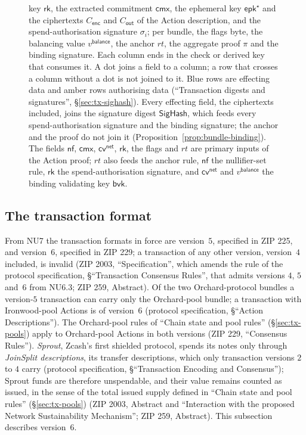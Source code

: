 \documentclass[11pt,a4paper]{article}
\theoremstyle{definition}
\newcommand{\nfsym}{\mathsf{nf}}
\newcommand{\cmx}{\mathsf{cmx}}
\newcommand{\cvsym}{\mathsf{cv}}
\newcommand{\rk}{\mathsf{rk}}
\begin{document}
\begin{figure}[tp]
{key $\rk$, the extracted commitment $\cmx$, the ephemeral key
$\mathsf{epk}^{\star}$ and the ciphertexts $C_{\mathsf{enc}}$ and
$C_{\mathsf{out}}$ of the Action description, and the spend-authorisation
signature $\sigma_i$; per bundle, the flags byte, the balancing value
$v^{\mathsf{balance}}$, the anchor $\mathit{rt}$, the aggregate proof $\pi$
and the binding signature. Each column ends in the check or derived key
that consumes it. A dot joins a field to a column; a row that crosses a
column without a dot is not joined to it. Blue rows are effecting data and
amber rows authorising data (``Transaction digests and signatures'',
\S\ref{sec:tx-sighash}). Every effecting field, the ciphertexts included,
joins the signature digest $\mathsf{SigHash}$, which feeds every
spend-authorisation signature and the binding signature; the anchor and the
proof do not join it (Proposition~\ref{prop:bundle-binding}). The fields
$\nfsym$, $\cmx$, $\cvsym^{\mathsf{net}}$, $\rk$, the flags and
$\mathit{rt}$ are primary inputs of the Action proof; $\mathit{rt}$ also
feeds the anchor rule, $\nfsym$ the nullifier-set rule, $\rk$ the
spend-authorisation signature, and $\cvsym^{\mathsf{net}}$ and
$v^{\mathsf{balance}}$ the binding validating key $\mathsf{bvk}$.}
\label{fig:bundle}
\end{figure}

\FloatBarrier
\subsection{The transaction format}\label{sec:tx-format}

From NU7 the transaction formats in force are version~$5$, specified in ZIP 225,
and version~$6$, specified in ZIP 229; a transaction of any other version,
version~$4$ included, is invalid (ZIP 2003, ``Specification'', which amends the
rule of the protocol specification, \S``Transaction Consensus Rules'', that
admits versions $4$, $5$ and~$6$ from NU6.3; ZIP 259, Abstract). Of the two
Orchard-protocol bundles a version-$5$ transaction can carry only the
Orchard-pool bundle; a transaction with Ironwood-pool Actions is of version~$6$
(protocol specification, \S``Action Descriptions''). The Orchard-pool rules of
``Chain state and pool rules'' (\S\ref{sec:tx-pools}) apply to Orchard-pool
Actions in both versions (ZIP 229, ``Consensus Rules''). \emph{Sprout}, Zcash's
first shielded protocol, spends its notes only through \emph{JoinSplit
descriptions}, its transfer descriptions, which only transaction versions $2$ to
$4$ carry (protocol specification, \S``Transaction Encoding and Consensus'');
Sprout funds are therefore unspendable, and their value remains counted as
issued, in the sense of the total issued supply defined in ``Chain state and
pool rules'' (\S\ref{sec:tx-pools}) (ZIP 2003, Abstract and ``Interaction with
the proposed Network Sustainability Mechanism''; ZIP 259, Abstract). This
subsection describes version~$6$.
\end{document}
